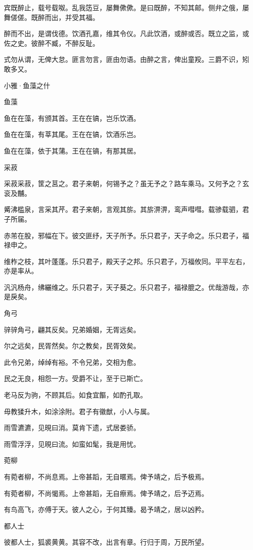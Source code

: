 宾既醉止，载号载呶。乱我笾豆，屡舞僛僛。是曰既醉，不知其邮。侧弁之俄，屡舞傞傞。既醉而出，并受其福。

醉而不出，是谓伐德。饮酒孔嘉，维其令仪。凡此饮酒，或醉或否。既立之监，或佐之史。彼醉不臧，不醉反耻。

式勿从谓，无俾大怠。匪言勿言，匪由勿语。由醉之言，俾出童羖。三爵不识，矧敢多又。




小雅·鱼藻之什


鱼藻

鱼在在藻，有颁其首。王在在镐，岂乐饮酒。

鱼在在藻，有莘其尾。王在在镐，饮酒乐岂。

鱼在在藻，依于其蒲。王在在镐，有那其居。

采菽

采菽采菽，筐之莒之。君子来朝，何锡予之？虽无予之？路车乘马。又何予之？玄衮及黼。

觱沸槛泉，言采其芹。君子来朝，言观其旂。其旂淠淠，鸾声嘒嘒。载骖载驷，君子所届。

赤芾在股，邪幅在下。彼交匪纾，天子所予。乐只君子，天子命之。乐只君子，福禄申之。

维柞之枝，其叶蓬蓬。乐只君子，殿天子之邦。乐只君子，万福攸同。平平左右，亦是率从。

汎汎杨舟，绋纚维之。乐只君子，天子葵之。乐只君子，福禄膍之。优哉游哉，亦是戾矣。

角弓

骍骍角弓，翩其反矣。兄弟婚姻，无胥远矣。

尔之远矣，民胥然矣。尔之教矣，民胥效矣。

此令兄弟，绰绰有裕。不令兄弟，交相为愈。

民之无良，相怨一方。受爵不让，至于已斯亡。

老马反为驹，不顾其后。如食宜饇，如酌孔取。

毋教猱升木，如涂涂附。君子有徽猷，小人与属。

雨雪瀌瀌，见晛曰消。莫肯下遗，式居娄骄。

雨雪浮浮，见晛曰流。如蛮如髦，我是用忧。

菀柳

有菀者柳，不尚息焉。上帝甚蹈，无自暱焉。俾予靖之，后予极焉。

有菀者柳，不尚愒焉。上帝甚蹈，无自瘵焉。俾予靖之，后予迈焉。

有鸟高飞，亦傅于天。彼人之心，于何其臻。曷予靖之，居以凶矜。

都人士

彼都人士，狐裘黄黄。其容不改，出言有章。行归于周，万民所望。


